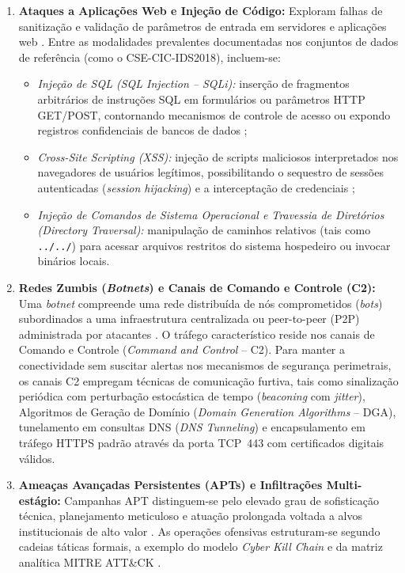 \begin{enumerate}
    \item \textbf{Ataques a Aplicações Web e Injeção de Código:}
    Exploram falhas de sanitização e validação de parâmetros de entrada em servidores e aplicações web \cite{webattacks2024, webattacks2024b}. Entre as modalidades prevalentes documentadas nos conjuntos de dados de referência (como o CSE-CIC-IDS2018), incluem-se:
    \begin{itemize}
        \item \emph{Injeção de SQL (SQL Injection -- SQLi):} inserção de fragmentos arbitrários de instruções SQL em formulários ou parâmetros HTTP GET/POST, contornando mecanismos de controle de acesso ou expondo registros confidenciais de bancos de dados \cite{webattacks2024};
        \item \emph{Cross-Site Scripting (XSS):} injeção de scripts maliciosos interpretados nos navegadores de usuários legítimos, possibilitando o sequestro de sessões autenticadas (\emph{session hijacking}) e a interceptação de credenciais \cite{webattacks2024b};
        \item \emph{Injeção de Comandos de Sistema Operacional e Travessia de Diretórios (\emph{Directory Traversal}):} manipulação de caminhos relativos (tais como \texttt{../../}) para acessar arquivos restritos do sistema hospedeiro ou invocar binários locais.
    \end{itemize}

    \item \textbf{Redes Zumbis (\emph{Botnets}) e Canais de Comando e Controle (C2):}
    Uma \emph{botnet} compreende uma rede distribuída de nós comprometidos (\emph{bots}) subordinados a uma infraestrutura centralizada ou peer-to-peer (P2P) administrada por atacantes \cite{Sharafaldin2018TowardGA}. O tráfego característico reside nos canais de Comando e Controle (\emph{Command and Control} -- C2). Para manter a conectividade sem suscitar alertas nos mecanismos de segurança perimetrais, os canais C2 empregam técnicas de comunicação furtiva, tais como sinalização periódica com perturbação estocástica de tempo (\emph{beaconing} com \emph{jitter}), Algoritmos de Geração de Domínio (\emph{Domain Generation Algorithms} -- DGA), tunelamento em consultas DNS (\emph{DNS Tunneling}) e encapsulamento em tráfego HTTPS padrão através da porta TCP~443 com certificados digitais válidos.

    \item \textbf{Ameaças Avançadas Persistentes (APTs) e Infiltrações Multi-estágio:}
    Campanhas APT distinguem-se pelo elevado grau de sofisticação técnica, planejamento meticuloso e atuação prolongada voltada a alvos institucionais de alto valor \cite{deepstage2026}. As operações ofensivas estruturam-se segundo cadeias táticas formais, a exemplo do modelo \emph{Cyber Kill Chain} e da matriz analítica MITRE ATT\&CK \cite{stix2026}.
    

\end{enumerate}

